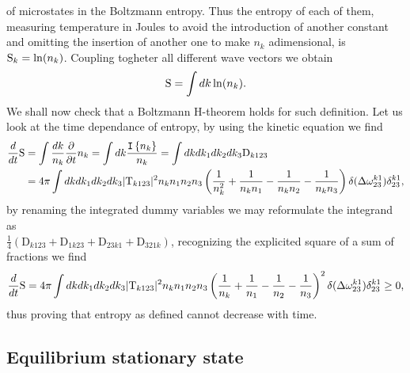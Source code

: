 of microstates in the Boltzmann entropy. Thus the entropy of each of them, measuring temperature in Joules to avoid the introduction of another constant
and omitting the insertion of another one to make $n_k$ adimensional, is $\mathrm{S}_k = \ln(n_k)$. Coupling togheter all different wave vectors we obtain 
\begin{equation}
    \mathrm{S} = \int dk \ln(n_k).
\end{equation}
We shall now check that a Boltzmann H-theorem holds for such definition. Let us look at the time dependance of entropy, by using the kinetic equation we find
\begin{align}
    \frac{d}{dt} \mathrm{S} &= \int \frac{dk}{n_k} \frac{\partial}{\partial t} n_k = \int dk \frac{\mathtt{I}\left\{n_k\right\}}{n_k} = \int dk dk_1 dk_2 dk_3 \mathrm{D}_{k123}\\
    &= 4\pi \int dk dk_1 dk_2 dk_3 |\mathrm{T}_{k123}|^2 n_k n_1 n_2 n_3 \left(\frac{1}{n_k^2} + \frac{1}{n_k n_1}-\frac{1}{n_k n_2}-\frac{1}{n_k n_3}\right)
    \delta(\Delta{\omega}^{k1}_{23})\delta^{k1}_{23},
\end{align}
by renaming the integrated dummy variables we may reformulate the integrand as \\ 
$\frac{1}{4} \left(\mathrm{D}_{k123}+\mathrm{D}_{1k23}+\mathrm{D}_{23k1}+
\mathrm{D}_{321k} \right)$, recognizing the explicited square of a sum of fractions we find
\begin{equation}
    \frac{d}{dt} \mathrm{S} = 4\pi \int dk dk_1 dk_2 dk_3 |\mathrm{T}_{k123}|^2 n_k n_1 n_2 n_3 \left( \frac{1}{n_k} + \frac{1}{n_1}-\frac{1}{n_2}-\frac{1}{n_3}\right)^2 
    \delta(\Delta{\omega}^{k1}_{23})\delta^{k1}_{23}\ge 0,
\end{equation}
thus proving that entropy as defined cannot decrease with time. \\

\subsection{Equilibrium stationary state}

